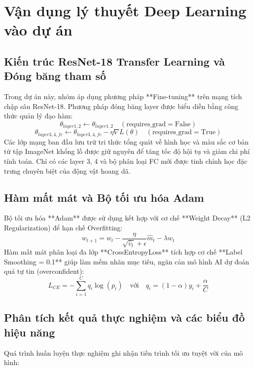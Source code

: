 \documentclass[12pt,a4paper]{report}
\begin{document}
\chapter{Vận dụng lý thuyết Deep Learning vào dự án}

\section{Kiến trúc ResNet-18 Transfer Learning và Đóng băng tham số}
Trong dự án này, nhóm áp dụng phương pháp **Fine-tuning** trên mạng tích chập sâu ResNet-18. 
Phương pháp đóng băng layer được biểu diễn bằng công thức quản lý đạo hàm:
\begin{equation}
\theta_{layer1, 2} \leftarrow \theta_{layer1, 2} \quad (\text{requires\_grad} = \text{False})
\end{equation}
\begin{equation}
\theta_{layer3, 4, fc} \leftarrow \theta_{layer3, 4, fc} - \eta \nabla L(\theta) \quad (\text{requires\_grad} = \text{True})
\end{equation}
Các lớp mạng ban đầu lưu trữ tri thức tổng quát về hình học và màu sắc cơ bản từ tập ImageNet khổng lồ được giữ nguyên để tăng tốc độ hội tụ và giảm chi phí tính toán. Chỉ có các layer 3, 4 và bộ phân loại FC mới được tinh chỉnh học đặc trưng chuyên biệt của động vật hoang dã.

\section{Hàm mất mát và Bộ tối ưu hóa Adam}
Bộ tối ưu hóa **Adam** được sử dụng kết hợp với cơ chế **Weight Decay** (L2 Regularization) để hạn chế Overfitting:
\begin{equation}
w_{t+1} = w_t - \frac{\eta}{\sqrt{\hat{v}_t} + \epsilon} \hat{m}_t - \lambda w_t
\end{equation}
Hàm mất mát phân loại đa lớp **CrossEntropyLoss** tích hợp cơ chế **Label Smoothing = 0.1** giúp làm mềm nhãn mục tiêu, ngăn cản mô hình AI dự đoán quá tự tin (overconfident):
\begin{equation}
L_{CE} = -\sum_{i=1}^{C} q_i \log(p_i) \quad \text{với} \quad q_i = (1 - \alpha) y_i + \frac{\alpha}{C}
\end{equation}

\section{Phân tích kết quả thực nghiệm và các biểu đồ hiệu năng}
Quá trình huấn luyện thực nghiệm ghi nhận tiến trình tối ưu tuyệt vời của mô hình:\\
\end{document}
